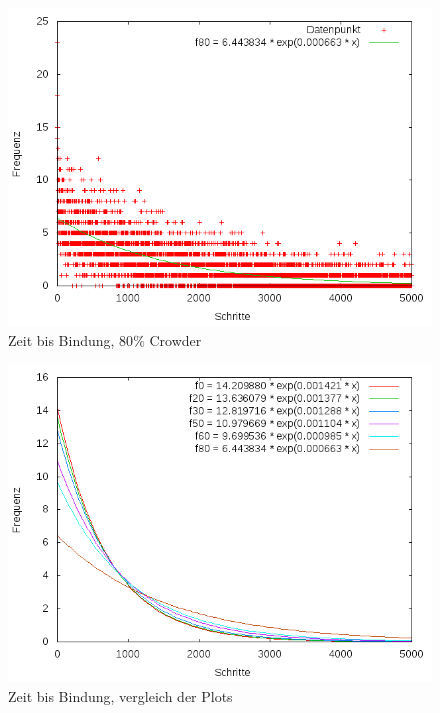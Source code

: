 \documentclass[bachelor,       %
               twoside,        %
               BCOR10mm,       %
               english,ngerman, %
               ]{GAUBM}
\begin{document}
\begin{figure}
  \centering
  \includegraphics[width=0.9\linewidth]{find80.png}
  \caption{Zeit bis Bindung, 80$\%$ Crowder}
  \label{fig:cr80}
\end{figure}

\begin{figure}
  \centering
  \includegraphics[width=0.9\linewidth]{comparison.png}
  \caption{Zeit bis Bindung, vergleich der Plots}
  \label{fig:comp}
\end{figure}
\end{document}
